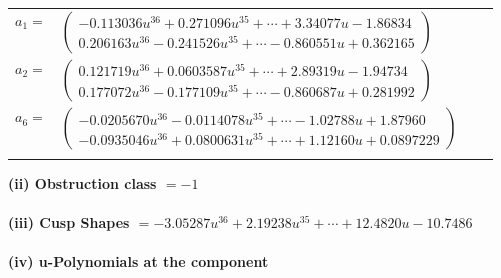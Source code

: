 \documentclass[1p]{elsarticle_modified}
\theoremstyle{definition}
\begin{document}
\begin{tabular}{m{7pt} m{180pt} m{7pt} m{180pt} }
\flushright $a_{1}=$&$\begin{pmatrix}-0.113036 u^{36}+0.271096 u^{35}+\cdots+3.34077 u-1.86834\\0.206163 u^{36}-0.241526 u^{35}+\cdots-0.860551 u+0.362165\end{pmatrix}$ \\
\flushright $a_{2}=$&$\begin{pmatrix}0.121719 u^{36}+0.0603587 u^{35}+\cdots+2.89319 u-1.94734\\0.177072 u^{36}-0.177109 u^{35}+\cdots-0.860687 u+0.281992\end{pmatrix}$ \\
\flushright $a_{6}=$&$\begin{pmatrix}-0.0205670 u^{36}-0.0114078 u^{35}+\cdots-1.02788 u+1.87960\\-0.0935046 u^{36}+0.0800631 u^{35}+\cdots+1.12160 u+0.0897229\end{pmatrix}$\\&\end{tabular}
\flushleft \textbf{(ii) Obstruction class $= -1$}\\~\\
\flushleft \textbf{(iii) Cusp Shapes $= -3.05287 u^{36}+2.19238 u^{35}+\cdots+12.4820 u-10.7486$}\\~\\
\newpage\renewcommand{\arraystretch}{1}
\flushleft \textbf{(iv) u-Polynomials at the component}\newline \\
\end{document}
